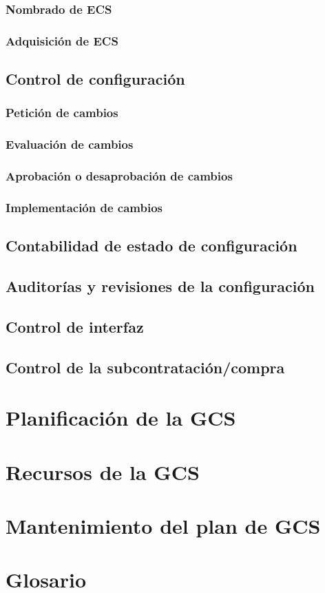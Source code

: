 \documentclass[11pt, a4paper, twoside, titlepage]{article}
\begin{document}
			\subsubsection{Nombrado de ECS}
			\subsubsection{Adquisición de ECS}
		\subsection{Control de configuración}
			\subsubsection{Petición de cambios}
			\subsubsection{Evaluación de cambios}
			\subsubsection{Aprobación o desaprobación de cambios}
			\subsubsection{Implementación de cambios}
		\subsection{Contabilidad de estado de configuración}
		\subsection{Auditorías y revisiones de la configuración}
		\subsection{Control de interfaz}
		\subsection{Control de la subcontratación/compra}
	\section{Planificación de la GCS}
	\section{Recursos de la GCS}
	\section{Mantenimiento del plan de GCS}
	\section{Glosario}
		\printglossaries

\end{document}
